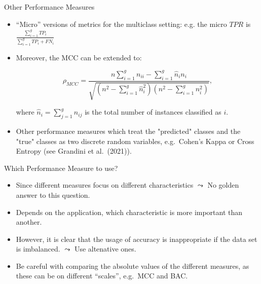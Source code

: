 \documentclass[11pt,compress,t,notes=noshow, xcolor=table]{beamer}
\begin{document}
\begin{vbframe}{Other Performance Measures}

	\footnotesize{

		\begin{itemize}
		
			\item ``Micro'' versions of metrics for the multiclass setting: e.g. the micro $TPR$ is $\frac{\sum_{i=1}^g TP_i}{\sum_{i=1}^g TP_i + FN_i}$ 
            \vspace{10pt}
		
			\item Moreover, the MCC can be extended to:
			
			$$   \rho_{MCC} = \frac{ n  \sum_{i=1}^g n_{ii} -  \sum_{i=1}^g \hat n_i n_i}{\sqrt{ (n^2 - \sum_{i=1}^g \hat n_i^2)(n^2 - \sum_{i=1}^g n_i^2)  }},$$

			where $\hat n_i = \sum_{j=1}^g n_{ij}$ is the total number of instances classified as $i.$
            \vspace{10pt}
        
		
			\item Other performance measures which treat the "predicted" classes and the "true" classes as two discrete random variables, e.g.\ Cohen's Kappa or Cross Entropy (see Grandini et al.\ (2021)).
		
		\end{itemize}
	}
\end{vbframe}


\begin{vbframe}{Which Performance Measure to use?}

	\small{

		\begin{itemize}

            \item Since different measures focus on different characteristics $\leadsto$ No golden answer to this question.
            \vspace{20pt}
	
			\item Depends on the application, which characteristic is more important than another.
            \vspace{20pt}

			\item However, it is clear that the usage of accuracy is inappropriate if the data set is imbalanced. $\leadsto$ Use altenative ones.
            \vspace{20pt}

			\item Be careful with comparing the absolute values of the different measures, as these can be on different ``scales'', e.g.\ MCC and BAC. 
            \vspace{20pt}
	
		\end{itemize}
	}
\end{vbframe}



%
\endlecture
\end{document}
